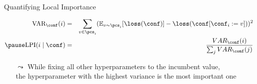 \begin{frame}[c]{Quantifying Local Importance }

\begin{eqnarray}
\text{VAR}_{\conf} (i)  &=& \sum_{v \in \pcs_{i}} (\mathbb{E}_{v \sim \pcs_{i}}[\loss(\conf) ] - \loss(\conf[ \conf_{i} := v]))^2\\
\pause
\text{LPI}( i  \mid \conf ) &=& \frac{VAR_{\conf} (i) }{ \sum_{j}  VAR_{\conf} (j)}
\end{eqnarray}

\bigskip
\pause

\begin{itemize}
	\item[$\leadsto$] While fixing all other hyperparameters to the incumbent value,\\ the hyperparameter with the highest variance  is the most important one
\end{itemize}

\end{frame}
